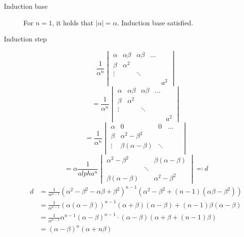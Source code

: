 \documentclass[a4paper]{article}
\theoremstyle{definition}
\begin{document}
\begin{description}
  \item[Induction base] 
    For $n=1$, it holds that $|\alpha| = \alpha$. Induction base satisfied.
  \item[Induction step]
    \[
      \frac1{\alpha^n}
      \begin{vmatrix}
        \alpha & \alpha \beta & \alpha\beta & \ldots & \\
        \beta  & \alpha^2     &             &        & \\
        \vdots &              & \ddots      &        & \\
               &              &             &        & a^2
      \end{vmatrix}
    \] \[
       = \frac1{\alpha^n}
      \begin{vmatrix}
        \alpha & \alpha \beta & \alpha \beta & \ldots & \\
        \beta  & \alpha^2     &              &        & \\
        \vdots &              & \ddots       &        & \\
               &              &              &        & a^2
      \end{vmatrix}
    \] \[
       = \frac1{\alpha^n}
      \begin{vmatrix}
        \alpha & 0            & 0            & \ldots & \\
        \beta  & \alpha^2 - \beta^2 &              &        & \\
        \vdots & \beta (\alpha - \beta) & \ddots       &        & \\
               &              &              &        &
      \end{vmatrix}
    \] \[
      = \alpha \frac{1}{alpha^n}
      \begin{vmatrix}
        \alpha^2 - \beta^2 & & \beta (\alpha - \beta) \\
                           & \ddots & \\
        \beta (\alpha - \beta) &    & \alpha^2 - \beta^2
      \end{vmatrix} \eqqcolon d
    \]
    \begin{align*}
      d &=
          \frac{1}{\alpha^{n-1}} (\alpha^2 - \beta^2 - \alpha \beta + \beta^2)^{n-1}
          \left(\alpha^2 - \beta^2 + (n-1)(\alpha \beta - \beta^2) \right) \\
        &= \frac{1}{\alpha^{n-1}} (\alpha(\alpha - \beta))^{n-1} (\alpha + \beta)(\alpha - \beta) + (n-1)\beta(\alpha - \beta) \\
        &= \frac{1}{\alpha^{n-1}} \alpha^{n-1} (\alpha - \beta)^{n-1} \cdot (\alpha - \beta)(\alpha + \beta + (n-1) \beta) \\
        &= (\alpha - \beta)^n (\alpha + n\beta)
    \end{align*}
\end{description}
\end{document}
